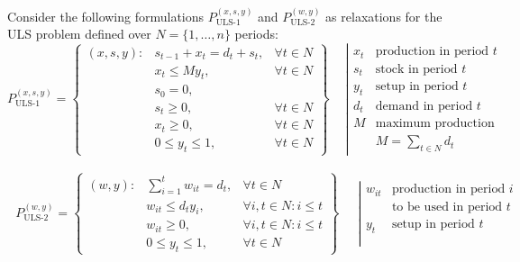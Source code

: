 Consider the following formulations $P_{\text{ULS-1}}^{(x,s,y)}$ and $P_{\text{ULS-2}}^{(w,y)}$ as relaxations for the ULS problem defined over $N = \{1,\dots,n\}$ periods:
\renewcommand*{\arraystretch}{1.1}
\[P_{\text{ULS-1}}^{(x,s,y)} = \left\{
  \begin{array}{llr}
  	(x,s,y): & s_{t-1} + x_t = d_t + s_t, & \forall t\in N\\
    	     & x_t  \leq M y_t, 		  & \forall t\in N\\
    	     & s_0 = 0, 			      & 			  \\
    	     & s_t \geq 0, 				  & \forall t\in N\\
    	     & x_t \geq 0, 			      & \forall t\in N\\
    	     & 0 \leq y_{t} \leq 1, 	  & \forall t\in N
  \end{array}\right\}
  \quad~\left|
  \begin{array}{rr}
  	x_t  & \text{production in period } t\\
    s_t  & \text{stock in period }      t\\
    y_t  & \text{setup in period }      t\\[5pt]
    d_t  & \text{demand in period }     t\\
    M    & \text{maximum production}\\
         & M = \sum_{t\in N}d_t
  \end{array}\right.
\]\\[-30pt]


\[~~~P_{\text{ULS-2}}^{(w,y)} = \left\{
  \begin{array}{llr}
    (w,y): & \sum \limits_{i=1}^t w_{it} = d_t, &\forall t\in N\\
    	   & w_{it} \leq d_t y_i,  				&\forall i,t\in N : i\leq t\\
    	   & w_{it} \geq 0,        				&\forall i,t\in N : i\leq t\\
    	   & 0 \leq y_{t} \leq 1,  				&\forall t\in N 
  \end{array}\right\}
  \quad~~\left|
  \begin{array}{rr}
  	w_{it} & \text{production in period } i\\
      	   & \text{to be used in period } t\\[3pt]
       y_t & \text{setup in period } t\\
       	   & \\[7pt] 
  \end{array}\right.
\]

